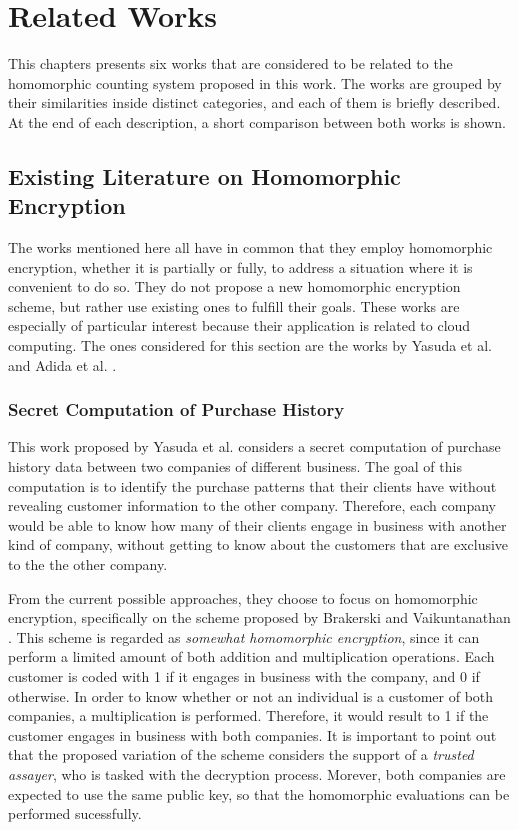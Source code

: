 \chapter{Related Works}
\label{relatedWorks}

This chapters presents six works that are considered to be related to the homomorphic counting system proposed in this work. The works are grouped by their similarities inside distinct categories, and each of them is briefly described. At the end of each description, a short comparison between both works is shown. 

\section{{Existing Literature on Homomorphic Encryption}}
The works mentioned here all have in common that they employ homomorphic encryption, whether it is partially or fully, to address a situation where it is convenient to do so. They do not propose a new homomorphic encryption scheme, but rather use existing ones to fulfill their goals. These works are especially of particular interest because their application is related to cloud computing. The ones considered for this section are the works by Yasuda et al. \cite{Yasuda:2015:SDD:2732516.2732521, yasuda2014} and Adida et al. \cite{adida2008helios}.

\subsection{Secret Computation of Purchase History}
This work proposed by Yasuda et al. \cite{yasuda2014} considers a secret computation of purchase history data between two companies of different business. The goal of this computation is to identify the purchase patterns that their clients have without revealing customer information to the other company. Therefore, each company would be able to know how many of their clients engage in business with another kind of company, without getting to know about the customers that are exclusive to the the other company.

From the current possible approaches, they choose to focus on homomorphic encryption, specifically on the scheme proposed by Brakerski and Vaikuntanathan \cite{cryptoeprint:2011:277}. This scheme is regarded as \emph{somewhat homomorphic encryption}, since it can perform a limited amount of both addition and multiplication operations. Each customer is coded with 1 if it engages in business with the company, and 0 if otherwise. In order to know whether or not an individual is a customer of both companies, a multiplication is performed. Therefore, it would result to 1 if the customer engages in business with both companies. It is important to point out that the proposed variation of the scheme considers the support of a \emph{trusted assayer}, who is tasked with the decryption process. Morever, both companies are expected to use the same public key, so that the homomorphic evaluations can be performed sucessfully.

